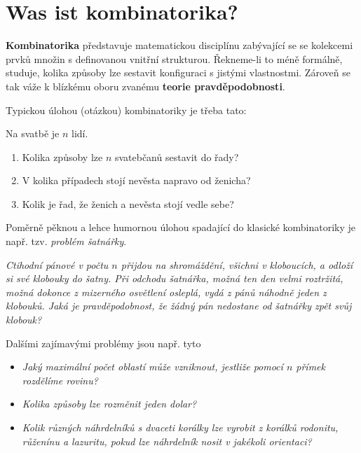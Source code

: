 \section{Was ist kombinatorika?}

\textbf{Kombinatorika} představuje matematickou disciplínu zabývající se se kolekcemi prvků množin s definovanou vnitřní strukturou. Řekneme-li to méně formálně, studuje, kolika způsoby lze sestavit konfiguraci s jistými vlastnostmi. Zároveň se tak váže k blízkému oboru zvanému \textbf{teorie pravděpodobnosti}. \par
Typickou úlohou (otázkou) kombinatoriky je třeba tato:

\begin{exercise}\label{exercise:intro}
    Na svatbě je $n$ lidí.
    \begin{enumerate}[label=(\alph*)]
        \item Kolika způsoby lze $n$ svatebčanů sestavit do řady?
        \item V kolika případech stojí nevěsta napravo od ženicha?
        \item Kolik je řad, že ženich a nevěsta stojí vedle sebe?
    \end{enumerate}
\end{exercise}

Poměrně pěknou a lehce humornou úlohou spadající do klasické kombinatoriky je např. tzv. \emph{problém šatnářky}.

\begin{exercise}\label{exercise:problem_satnarky}
    \textit{Ctihodní pánové v počtu $n$ přijdou na shromáždění, všichni v kloboucích, a odloží si své klobouky do šatny. Při odchodu šatnářka, možná ten den velmi roztržitá, možná dokonce z mizerného osvětlení osleplá, vydá z pánů náhodně jeden z klobouků. Jaká je pravděpodobnost, že žádný pán nedostane od šatnářky zpět svůj klobouk?} \citep[str.~105]{MatousekNesetril2009}
\end{exercise}

Dalšími zajímavými problémy jsou např. tyto

\begin{exercise}
    \begin{itemize}
        \item \textit{Jaký maximální počet oblastí může vzniknout, jestliže pomocí $n$ přímek rozdělíme rovinu?} \citep[str. 38]{Slavik2022}
        \item \textit{Kolika způsoby lze rozměnit jeden dolar?} \citep[str. 130]{HarrisHirstMossinghoff2010}
        \item \textit{Kolik různých náhrdelníků s dvaceti korálky lze vyrobit z korálků rodonitu, růženínu a lazuritu, pokud lze náhrdelník nosit v jakékoli orientaci?} \citep[str. 130]{HarrisHirstMossinghoff2010}
    \end{itemize}
\end{exercise}

